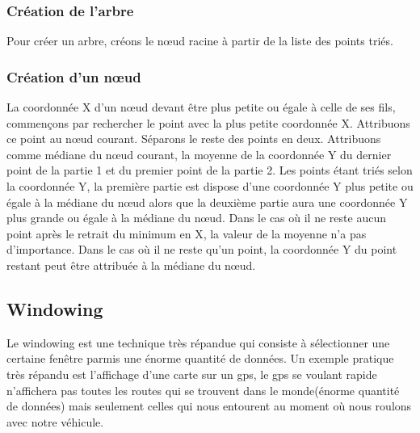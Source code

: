 \documentclass[10pt,a4paper]{article}
\begin{document}
\subsubsection{Création de l'arbre}
Pour créer un arbre, créons le nœud racine à partir de la liste des points triés.

\subsubsection{Création d'un nœud}
La coordonnée X d'un nœud devant être plus petite ou égale à celle de ses fils, commençons par rechercher le point avec la plus petite coordonnée X. Attribuons ce point au nœud courant. Séparons le reste des points en deux. Attribuons comme médiane du nœud courant, la moyenne de la coordonnée Y du dernier point de la partie 1 et du premier point de la partie 2. Les points étant triés selon la coordonnée Y, la première partie est dispose d'une coordonnée Y plus petite ou égale à la médiane du nœud alors que la deuxième partie aura une coordonnée Y plus grande ou égale à la médiane du nœud. Dans le cas où il ne reste aucun point après le retrait du minimum en X, la valeur de la moyenne n'a pas d'importance. Dans le cas où il ne reste qu'un point, la coordonnée Y du point restant peut être attribuée à la médiane du nœud.





\subsection{Windowing}
Le windowing est une technique très répandue qui consiste à sélectionner une certaine fenêtre parmis une énorme quantité de données. Un exemple pratique très répandu est l'affichage d'une carte sur un gps, le gps se voulant rapide n'affichera pas toutes les routes qui se trouvent dans le monde(énorme quantité de données) mais seulement celles qui nous entourent au moment où  nous roulons avec notre véhicule. 
\end{document}
